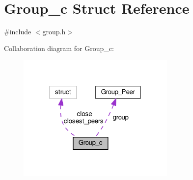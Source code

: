 \hypertarget{struct_group__c}{\section{Group\+\_\+c Struct Reference}
\label{struct_group__c}
}


{\ttfamily \#include $<$group.\+h$>$}



Collaboration diagram for Group\+\_\+c\+:
\nopagebreak
\begin{figure}[H]
\begin{center}
\leavevmode
\includegraphics[width=219pt]{dd/d78/struct_group__c__coll__graph}
\end{center}
\end{figure}
